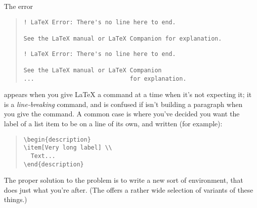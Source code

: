 The error
\begin{quote}
\begin{wideversion}
\begin{verbatim}
! LaTeX Error: There's no line here to end.

See the LaTeX manual or LaTeX Companion for explanation.
\end{verbatim}
\end{wideversion}
\begin{narrowversion}
\begin{verbatim}
! LaTeX Error: There's no line here to end.

See the LaTeX manual or LaTeX Companion
...                           for explanation.
\end{verbatim}
\end{narrowversion}
\end{quote}
appears when you give \LaTeX{} a \texttt{\bsbs } command at a time
when it's not expecting it; it is a \emph{line-breaking} command, and
is confused if \latex{} isn't building a paragraph when you give the
command.  A common case is where you've decided you want the label of
a list item to be on a line of its own, and written (for example):
\begin{quote}
\begin{verbatim}
\begin{description}
\item[Very long label] \\
  Text...
\end{description}
\end{verbatim}
\end{quote}

The proper solution to the problem is to write a new sort of
 environment, that does just what you're after.  (The
\nothtml{~---}
offers a rather wide selection of variants of these things.)

